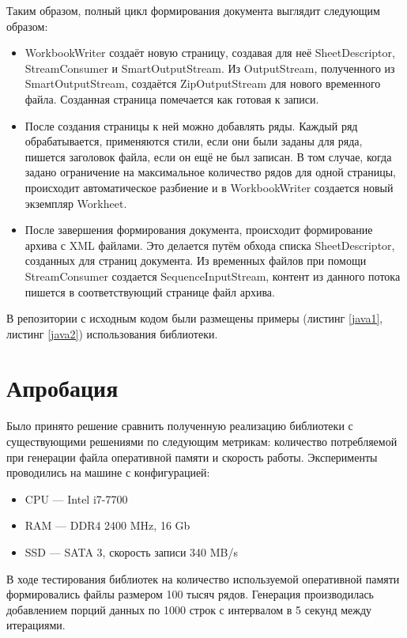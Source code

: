 \documentclass[14pt]{matmex-diploma}
\begin{document}
Таким образом, полный цикл формирования документа выглядит следующим образом: 
\begin{itemize}
    \item WorkbookWriter создаёт новую страницу, создавая для неё SheetDescriptor, StreamConsumer и SmartOutputStream. Из OutputStream, полученного из SmartOutputStream, создаётся ZipOutputStream для нового временного файла. Созданная страница помечается как готовая к записи.
    \item После создания страницы к ней можно добавлять ряды. Каждый ряд обрабатывается, применяются стили, если они были заданы для ряда, пишется заголовок файла, если он ещё не был записан. В том случае, когда задано ограничение на максимальное количество рядов для одной страницы, происходит автоматическое разбиение и в WorkbookWriter создается новый экземпляр Workheet.
    \item После завершения формирования документа, происходит формирование архива с XML файлами. Это делается путём обхода списка SheetDescriptor, созданных для страниц документа. Из временных файлов при помощи StreamConsumer создается SequenceInputStream, контент из данного потока пишется в соответствующий странице файл архива. 
\end{itemize}
В репозитории с исходным кодом были размещены примеры (листинг \ref{java1}, листинг \ref{java2}) использования библиотеки.
\section{Апробация}
Было принято решение сравнить полученную реализацию библиотеки с существующими решениями по следующим метрикам: количество потребляемой при генерации файла оперативной памяти и скорость работы.
Эксперименты проводились на машине с конфигурацией: 
\begin{itemize}
    \item CPU --- Intel i7-7700
    \item RAM --- DDR4 2400 MHz, 16 Gb
    \item SSD --- SATA 3, скорость записи 340 MB/s
\end{itemize}

В ходе тестирования библиотек на количество используемой оперативной памяти формировались файлы размером 100 тысяч рядов. Генерация производилась добавлением порций данных по 1000 строк с интервалом в 5 секунд между итерациями. 
\end{document}
